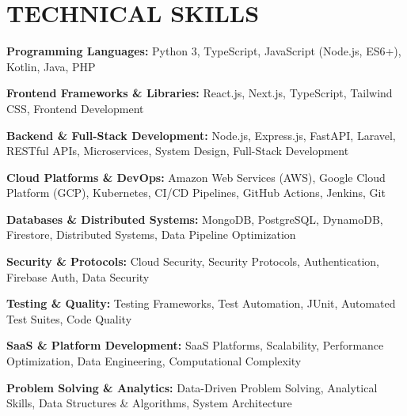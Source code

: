 \documentclass[letterpaper,11pt]{article}
\begin{document}
\section{\color{airforceblue}TECHNICAL SKILLS}
 \begin{itemize}[leftmargin=0in, label={}]
    \small{\item{
     \textbf{\normalsize{Programming Languages:}}{ \normalsize{Python 3, TypeScript, JavaScript (Node.js, ES6+), Kotlin, Java, PHP}} \\
      \vspace{1.2pt}
      
     \textbf{\normalsize{Frontend Frameworks \& Libraries:}}{ \normalsize{React.js, Next.js, TypeScript, Tailwind CSS, Frontend Development}} \\
      \vspace{1.2pt}
      
     \textbf{\normalsize{Backend \& Full-Stack Development:}}{ \normalsize{Node.js, Express.js, FastAPI, Laravel, RESTful APIs, Microservices, System Design, Full-Stack Development}} \\
      \vspace{1.2pt}
      
     \textbf{\normalsize{Cloud Platforms \& DevOps:}}{ \normalsize{Amazon Web Services (AWS), Google Cloud Platform (GCP), Kubernetes, CI/CD Pipelines, GitHub Actions, Jenkins, Git}} \\
      \vspace{1.2pt}
      
     \textbf{\normalsize{Databases \& Distributed Systems:}}{ \normalsize{MongoDB, PostgreSQL, DynamoDB, Firestore, Distributed Systems, Data Pipeline Optimization}} \\
      \vspace{1.2pt}
      
     \textbf{\normalsize{Security \& Protocols:}}{ \normalsize{Cloud Security, Security Protocols, Authentication, Firebase Auth, Data Security}} \\
      \vspace{1.2pt}
      
     \textbf{\normalsize{Testing \& Quality:}}{ \normalsize{Testing Frameworks, Test Automation, JUnit, Automated Test Suites, Code Quality}} \\
      \vspace{1.2pt}
      
     \textbf{\normalsize{SaaS \& Platform Development:}}{ \normalsize{SaaS Platforms, Scalability, Performance Optimization, Data Engineering, Computational Complexity}} \\
      \vspace{1.2pt}
      
     \textbf{\normalsize{Problem Solving \& Analytics:}}{ \normalsize{Data-Driven Problem Solving, Analytical Skills, Data Structures \& Algorithms, System Architecture}}

     }}
 \end{itemize}
 \vspace{-16pt}
\end{document}
